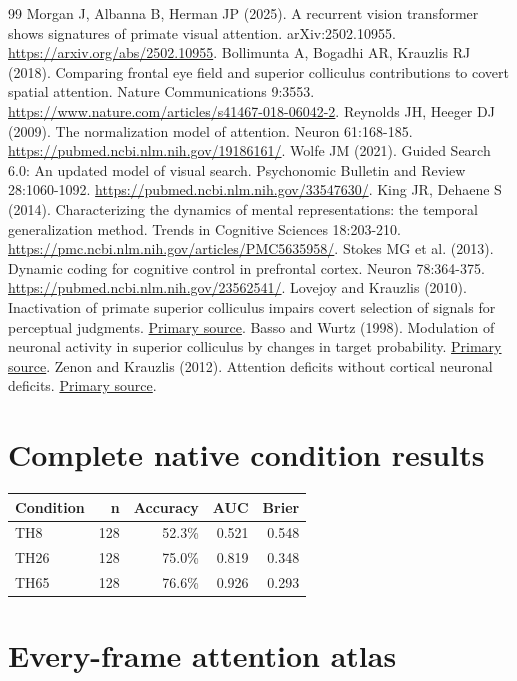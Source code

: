\documentclass[11pt]{article}
\begin{document}
\begin{thebibliography}{99}
 Morgan J, Albanna B, Herman JP (2025). A recurrent vision transformer shows signatures of primate visual attention. arXiv:2502.10955. \url{https://arxiv.org/abs/2502.10955}.
 Bollimunta A, Bogadhi AR, Krauzlis RJ (2018). Comparing frontal eye field and superior colliculus contributions to covert spatial attention. Nature Communications 9:3553. \url{https://www.nature.com/articles/s41467-018-06042-2}.
 Reynolds JH, Heeger DJ (2009). The normalization model of attention. Neuron 61:168-185. \url{https://pubmed.ncbi.nlm.nih.gov/19186161/}.
 Wolfe JM (2021). Guided Search 6.0: An updated model of visual search. Psychonomic Bulletin and Review 28:1060-1092. \url{https://pubmed.ncbi.nlm.nih.gov/33547630/}.
 King JR, Dehaene S (2014). Characterizing the dynamics of mental representations: the temporal generalization method. Trends in Cognitive Sciences 18:203-210. \url{https://pmc.ncbi.nlm.nih.gov/articles/PMC5635958/}.
 Stokes MG et al. (2013). Dynamic coding for cognitive control in prefrontal cortex. Neuron 78:364-375. \url{https://pubmed.ncbi.nlm.nih.gov/23562541/}.
 Lovejoy and Krauzlis (2010). Inactivation of primate superior colliculus impairs covert selection of signals for perceptual judgments. \href{https://pubmed.ncbi.nlm.nih.gov/20023651/}{Primary source}.
 Basso and Wurtz (1998). Modulation of neuronal activity in superior colliculus by changes in target probability. \href{https://pubmed.ncbi.nlm.nih.gov/9736670/}{Primary source}.
 Zenon and Krauzlis (2012). Attention deficits without cortical neuronal deficits. \href{https://pubmed.ncbi.nlm.nih.gov/22972195/}{Primary source}.
\end{thebibliography}\clearpage\appendix\section{Complete native condition results}
\small\begin{longtable}{p{}rrrr}\toprule Condition & n & Accuracy & AUC & Brier\\\midrule\endhead
TH8 & 128 & 52.3\% & 0.521 & 0.548\\
TH26 & 128 & 75.0\% & 0.819 & 0.348\\
TH65 & 128 & 76.6\% & 0.926 & 0.293\\
\bottomrule\end{longtable}\normalsize\section{Every-frame attention atlas}
\end{document}
